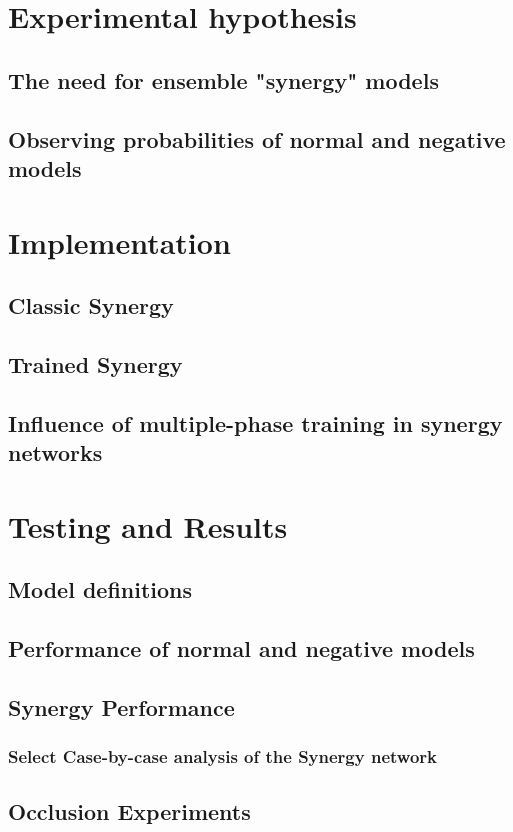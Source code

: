 \documentclass[b5paper]{book}
\begin{document}
\chapter{Experimental hypothesis}
\section{The need for ensemble "synergy" models}
\section{Observing probabilities of normal and negative models}

\chapter{Implementation}

\section{Classic Synergy}
\section{Trained Synergy}
\section{Influence of multiple-phase training in synergy networks}

\chapter{Testing and Results}

\section{Model definitions}
\section{Performance of normal and negative models}
\section{Synergy Performance}
\subsection{Select Case-by-case analysis of the Synergy network}
\section{Occlusion Experiments}
\end{document}
